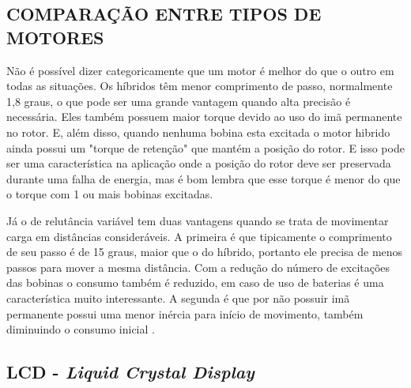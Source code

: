 \subsection{COMPARAÇÃO ENTRE TIPOS DE MOTORES}
Não é possível dizer categoricamente que um motor é melhor do que o outro em todas as situações. Os híbridos têm menor comprimento de passo, normalmente 1,8 graus, o que pode ser uma grande vantagem quando alta precisão é necessária. Eles também possuem maior torque devido ao uso do imã permanente no rotor. E, além disso, quando nenhuma bobina esta excitada o motor hibrido ainda possui um "torque de retenção" que mantém a posição do rotor. E isso pode ser uma característica na aplicação onde a posição do rotor deve ser preservada durante uma falha de energia, mas é bom lembra que esse torque é menor do que o torque com 1 ou mais bobinas excitadas.

Já o de relutância variável tem duas vantagens quando se trata de movimentar carga em distâncias consideráveis. A primeira é que tipicamente o comprimento de seu passo é de 15 graus, maior que o do híbrido, portanto ele precisa de menos passos para mover a mesma distância. Com a redução do número de excitações das bobinas o consumo também é reduzido, em caso de uso de baterias é uma característica muito interessante. A segunda é que por não possuir imã permanente possui uma menor inércia para início de movimento, também diminuindo o consumo inicial \cite{acarnley2002stepping}.

\subsection{LCD - \emph{Liquid Crystal Display}}
